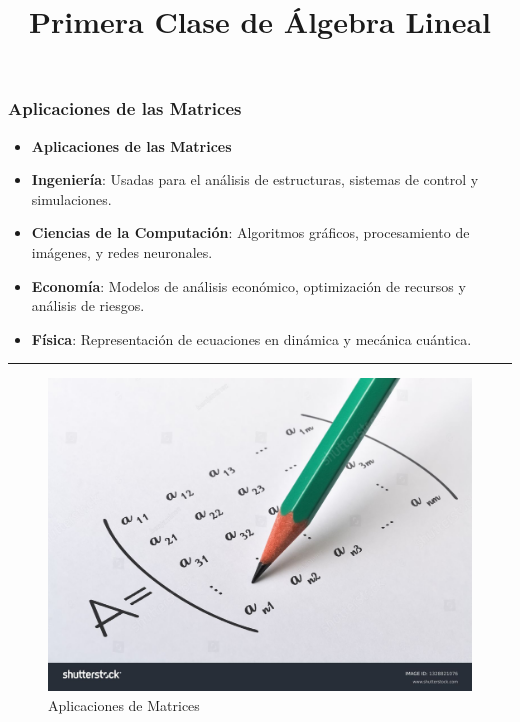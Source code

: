 \documentclass[
  letterpaper,
  DIV=11,
  numbers=noendperiod]{scrartcl}
\title{Primera Clase de Álgebra Lineal}
\author{}
\date{}
\begin{document}
\maketitle


\subsubsection{Aplicaciones de las
Matrices}\label{aplicaciones-de-las-matrices}

\begin{itemize}
\item
  \textbf{Aplicaciones de las Matrices}
\item
  \textbf{Ingeniería}: Usadas para el análisis de estructuras, sistemas
  de control y simulaciones.
\item
  \textbf{Ciencias de la Computación}: Algoritmos gráficos,
  procesamiento de imágenes, y redes neuronales.
\item
  \textbf{Economía}: Modelos de análisis económico, optimización de
  recursos y análisis de riesgos.
\item
  \textbf{Física}: Representación de ecuaciones en dinámica y mecánica
  cuántica.
\end{itemize}

\begin{center}\rule{0.5\linewidth}{0.5pt}\end{center}

\begin{figure}[H]

{\centering \includegraphics{figures/figuralineal.jpg}

}

\caption{Aplicaciones de Matrices}

\end{figure}%
\end{document}
